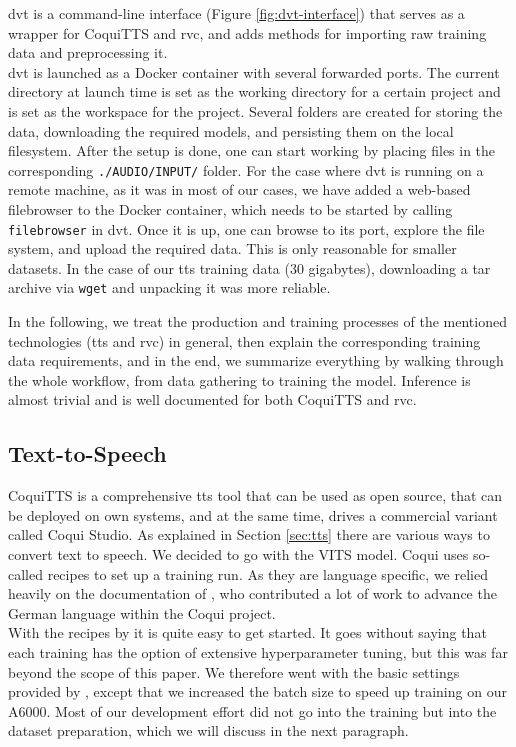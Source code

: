 \documentclass[
  a4paper,  %
  twoside,  %
  bibliography=totoc,
  headsepline,
  cleardoublepage=empty,
  parskip=half,
  draft=false
]{scrbook}
\begin{document}
\gls{dvt} is a command-line interface (Figure \ref{fig:dvt-interface}) that serves as a wrapper for CoquiTTS and \gls{rvc}, and adds methods for importing raw training data and preprocessing it. \\
\gls{dvt} is launched as a Docker container with several forwarded ports. The current directory at launch time is set as the working directory for a certain project and is set as the workspace for the project. Several folders are created for storing the data, downloading the required models, and persisting them on the local filesystem. After the setup is done, one can start working by placing files in the corresponding \verb|./AUDIO/INPUT/| folder. For the case where \gls{dvt} is running on a remote machine, as it was in most of our cases, we have added a web-based filebrowser to the Docker container, which needs to be started by calling \verb|filebrowser| in \gls{dvt}. Once it is up, one can browse to its port, explore the file system, and upload the required data. This is only reasonable for smaller datasets. In the case of our \gls{tts} training data (30 gigabytes), downloading a tar archive via \verb|wget| and unpacking it was more reliable. 

In the following, we treat the production and training processes of the mentioned technologies (\gls{tts} and \gls{rvc}) in general, then explain the corresponding training data requirements, and in the end, we summarize everything by walking through the whole workflow, from data gathering to training the model. Inference is almost trivial and is well documented for both CoquiTTS and \gls{rvc}.

\subsection{Text-to-Speech}
CoquiTTS is a comprehensive \gls*{tts} tool that can be used as open source, that can be deployed on own systems, and at the same time, drives a commercial variant called Coqui Studio. As explained in Section \ref{sec:tts} there are various ways to convert text to speech. We decided to go with the VITS model. Coqui uses so-called recipes to set up a training run. As they are language specific, we relied heavily on the documentation of , who contributed a lot of work to advance the German language within the Coqui project. \\
With the recipes by  it is quite easy to get started. It goes without saying that each training has the option of extensive hyperparameter tuning, but this was far beyond the scope of this paper. We therefore went with the basic settings provided by , except that we increased the batch size to speed up training on our A6000. Most of our development effort did not go into the training but into the dataset preparation, which we will discuss in the next paragraph.
\end{document}
